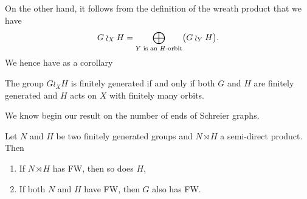 On the other hand, it follows from the definition of the wreath product that we have
\[
G\wr_XH=\bigoplus_{Y\textnormal{ is an $H$-orbit}}\bigl(G\wr_YH\bigr).
\]
We hence have as a corollary
\begin{lem}
The group $G\wr_XH$ is finitely generated if and only if both $G$ and $H$ are finitely generated and $H$ acts on $X$ with finitely many orbits.
\end{lem}
%
%
%
%
%
We know begin our result on the number of ends of Schreier graphs.
\begin{lem}\label{Lemma:Semidirect_ends}
Let $N$ and $H$ be two finitely generated groups and $N\rtimes H$ a semi-direct product.
Then
\begin{enumerate}
\item If $N\rtimes H$ has FW, then so does $H$,
\item If both $N$ and $H$ have FW, then $G$ also has FW.
\end{enumerate}
\end{lem}
